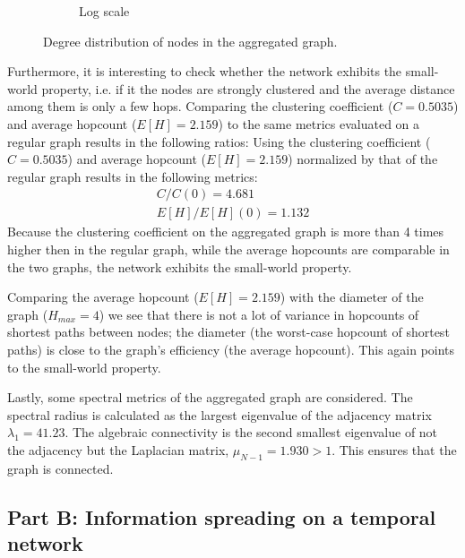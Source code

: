 \documentclass[letterpaper]{article}
\begin{document}
\begin{figure}
\begin{subfigure}[b]{0.48\textwidth}
        \caption{Log scale}
	    \label{fig:degree_distribution_loglog}
    \end{subfigure}
    \caption{Degree distribution of nodes in the aggregated graph.}
    \label{fig:degree_distribution_aggregated}
\end{figure}

Furthermore, it is interesting to check whether the network exhibits the small-world property, i.e. if it the nodes are strongly clustered and the average distance among them is only a few hops. 
Comparing the clustering coefficient (\(C=0.5035\)) and average hopcount (\(E[H]=2.159\)) to the same metrics evaluated on a regular graph results in the following ratios: 
Using the clustering coefficient (\(C=0.5035\)) and average hopcount (\(E[H]=2.159\)) normalized by that of the regular graph results in the following metrics: %
\begin{align*}
C/C(0) = 4.681\\
E[H]/E[H](0) = 1.132
\end{align*}
Because the clustering coefficient on the aggregated graph is more than 4 times higher then in the regular graph, while the average hopcounts are comparable in the two graphs, the network exhibits the small-world property. 

Comparing the average hopcount (\(E[H]=2.159\)) with the diameter of the graph (\(H_{max}=4\)) we see that there is not a lot of variance in hopcounts of shortest paths between nodes; the diameter (the worst-case hopcount of shortest paths) is close to the graph's efficiency (the average hopcount). This again points to the small-world property.

Lastly, some spectral metrics of the aggregated graph are considered. The spectral radius is calculated as the largest eigenvalue of the adjacency matrix \(\lambda_1=41.23\). The algebraic connectivity is the second smallest eigenvalue of not the adjacency but the Laplacian matrix, \(\mu_{N-1}=1.930 > 1\). This ensures that the graph is connected.


\subsection*{Part B: Information spreading on a temporal network}
\end{document}
